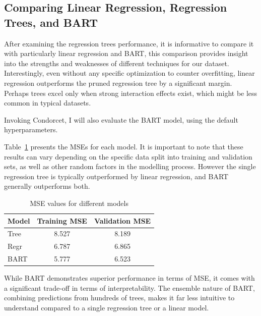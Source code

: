 \documentclass[12pt]{article}
\begin{document}
\subsection{Comparing Linear Regression, Regression Trees, and BART}

After examining the regression trees performance, it is informative to compare it with particularly linear regression and BART, this comparison provides insight into the strengths and weaknesses of different techniques for our dataset. Interestingly, even without any specific optimization to counter overfitting, linear regression outperforms the pruned regression tree by a significant margin. Perhaps trees excel only when strong interaction effects exist, which might be less common in typical datasets.

Invoking Condorcet, I will also evaluate the BART model, using the default hyperparameters.

Table~\ref{big_comparison} presents the MSEs for each model. It is important to note that these results can vary depending on the specific data split into training and validation sets, as well as other random factors in the modelling process. However the single regression tree is typically outperformed by linear regression, and BART generally outperforms both.

\begin{table}
    \centering
    \begin{tabular}{| l | c | c |}
        \hline
        Model & Training MSE & Validation MSE \\
        \hline
        Tree  & 8.527        & 8.189          \\
        Regr  & 6.787        & 6.865          \\
        BART  & 5.777        & 6.523          \\
        \hline
    \end{tabular}
    \caption{MSE values for different models}
    \label{big_comparison}
\end{table}

While BART demonstrates superior performance in terms of MSE, it comes with a significant trade-off in terms of interpretability. The ensemble nature of BART, combining predictions from hundreds of trees, makes it far less intuitive to understand compared to a single regression tree or a linear model.
\end{document}
